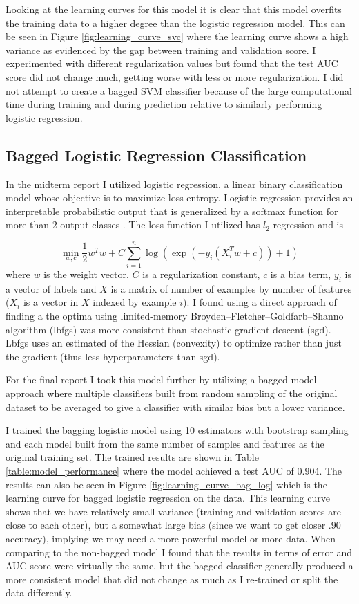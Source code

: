 \documentclass[11pt]{article}
\begin{document}
Looking at the learning curves for this model it is clear that this model overfits the training data to a higher degree than the logistic regression model.
This can be seen in Figure \ref{fig:learning_curve_svc} where the learning curve shows a high variance as evidenced by the gap between training and validation score.
I experimented with different regularization values but found that the test AUC score did not change much, getting worse with less or more regularization. 
I did not attempt to create a bagged SVM classifier because of the large computational time during training and during prediction relative to similarly performing logistic regression.

\subsection*{Bagged Logistic Regression Classification}
In the midterm report I utilized logistic regression, a linear binary classification model whose objective is to maximize loss entropy. 
Logistic regression provides an interpretable probabilistic output that is generalized by a softmax function for more than 2 output classes \cite{noauthor_11_nodate}.
The loss function I utilized has $l_2$ regression and is 

\[
\min_{w, c} \frac{1}{2}w^T w + C \sum_{i=1}^n \log(\exp(- y_i (X_i^T w + c)) + 1) 
\]
where $w$ is the weight vector, $C$ is a regularization constant, $c$ is a bias term, $y_i$ is a vector of labels and $X$ is a matrix of number of examples by number of features ($X_i$ is a vector in $X$ indexed by example $i$).
I found using a direct approach of finding a the optima using limited-memory Broyden–Fletcher–Goldfarb–Shanno algorithm (lbfgs)  was more consistent than stochastic gradient descent (sgd).
Lbfgs uses an estimated of the Hessian (convexity) to optimize rather than just the gradient (thus less hyperparameters than sgd).

For the final report I took this model further by utilizing a bagged model approach where multiple classifiers built from random sampling of the original dataset to be averaged to give a classifier with similar bias but a lower variance.

I trained the bagging logistic model using 10 estimators with bootstrap sampling and each model built from the same number of samples and features as the original training set.
The trained results are shown in Table \ref{table:model_performance} where the model achieved a test AUC of 0.904.
The results can also be seen in Figure \ref{fig:learning_curve_bag_log} which is the learning curve for bagged logistic regression on the data.
This learning curve shows that we have relatively small variance (training and validation scores are close to each other), but a somewhat large bias (since we want to get closer .90 accuracy), implying we may need a more powerful model or more data.
When comparing to the non-bagged model I found that the results in terms of error and AUC score were virtually the same, but the bagged classifier generally produced a more consistent model that did not change as much as I re-trained or split the data differently.
\end{document}
